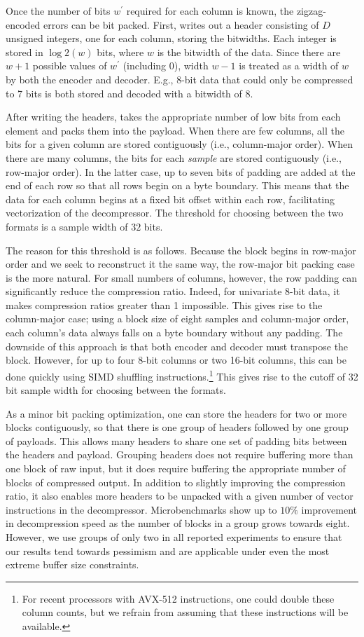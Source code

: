 Once the number of bits $w^\prime$ required for each column is known, the zigzag-encoded errors can be bit packed. First, \minesp writes out a header consisting of $D$ unsigned integers, one for each column, storing the bitwidths. Each integer is stored in $\log2(w)$ bits, where $w$ is the bitwidth of the data. Since there are $w+1$ possible values of $w^\prime$ (including 0), width $w-1$ is treated as a width of $w$ by both the encoder and decoder. E.g., 8-bit data that could only be compressed to 7 bits is both stored and decoded with a bitwidth of 8.

After writing the headers, \minesp takes the appropriate number of low bits from each element and packs them into the payload. When there are few columns, all the bits for a given column are stored contiguously (i.e., column-major order). When there are many columns, the bits for each \textit{sample} are stored contiguously (i.e., row-major order). In the latter case, up to seven bits of padding are added at the end of each row so that all rows begin on a byte boundary. This means that the data for each column begins at a fixed bit offset within each row, facilitating vectorization of the decompressor. The threshold for choosing between the two formats is a sample width of $32$ bits.

The reason for this threshold is as follows. Because the block begins in row-major order and we seek to reconstruct it the same way, the row-major bit packing case is the more natural. For small numbers of columns, however, the row padding can significantly reduce the compression ratio. Indeed, for univariate 8-bit data, it makes compression ratios greater than 1 impossible. This gives rise to the column-major case; using a block size of eight samples and column-major order, each column's data always falls on a byte boundary without any padding. The downside of this approach is that both encoder and decoder must transpose the block. However, for up to four 8-bit columns or two 16-bit columns, this can be done quickly using SIMD shuffling instructions.\footnote{For recent processors with AVX-512 instructions, one could double these column counts, but we refrain from assuming that these instructions will be available.} This gives rise to the cutoff of 32 bit sample width for choosing between the formats.

As a minor bit packing optimization, one can store the headers for two or more blocks contiguously, so that there is one group of headers followed by one group of payloads. This allows many headers to share one set of padding bits between the headers and payload. Grouping headers does not require buffering more than one block of raw input, but it does require buffering the appropriate number of blocks of compressed output. In addition to slightly improving the compression ratio, it also enables more headers to be unpacked with a given number of vector instructions in the decompressor. Microbenchmarks show up to $10\%$ improvement in decompression speed as the number of blocks in a group grows towards eight. However, we use groups of only two in all reported experiments to ensure that our results tend towards pessimism and are applicable under even the most extreme buffer size constraints.

